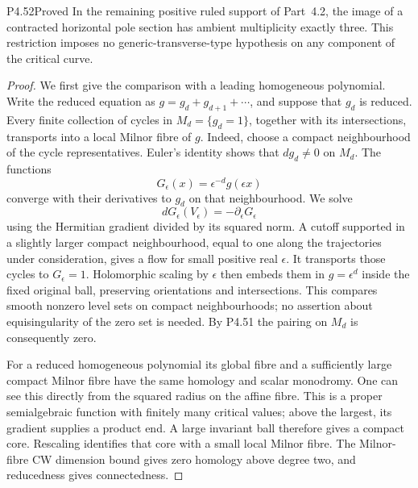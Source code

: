 \begin{statement}{P4.52}{Proved}
In the remaining positive ruled support of Part~4.2,
the image of a contracted horizontal pole section has
ambient multiplicity exactly three. This restriction
imposes no generic-transverse-type hypothesis on
any component of the critical curve.
\end{statement}
\begin{proof}
We first give the comparison with a leading
homogeneous polynomial. Write the reduced equation
as $g=g_d+g_{d+1}+\cdots$, and suppose that $g_d$ is
reduced. Every finite collection of cycles in
$M_d=\{g_d=1\}$, together with its intersections,
transports into a local Milnor fibre of $g$.
Indeed, choose a compact neighbourhood of the cycle
representatives. Euler's identity shows that
$dg_d\ne0$ on $M_d$. The functions
\[
 G_\epsilon(x)=\epsilon^{-d}g(\epsilon x)
\]
converge with their derivatives to $g_d$ on that
neighbourhood. We solve
\[
 dG_\epsilon(V_\epsilon)
                     =-\partial_\epsilon G_\epsilon
\]
using the Hermitian gradient divided by its squared
norm. A cutoff supported in a slightly larger
compact neighbourhood, equal to one along the
trajectories under consideration, gives a flow for
small positive real $\epsilon$. It transports those
cycles to $G_\epsilon=1$. Holomorphic scaling by
$\epsilon$ then embeds them in $g=\epsilon^d$ inside
the fixed original ball, preserving orientations
and intersections. This compares smooth nonzero
level sets on compact neighbourhoods; no assertion
about equisingularity of the zero set is needed.
By P4.51 the pairing on $M_d$ is consequently zero.

For a reduced homogeneous polynomial its global
fibre and a sufficiently large compact Milnor fibre
have the same homology and scalar monodromy. One
can see this directly from the squared radius on
the affine fibre. This is a proper semialgebraic
function with finitely many critical values; above
the largest, its gradient supplies a product end.
A large invariant ball therefore gives a compact
core. Rescaling identifies that core with a small
local Milnor fibre. The Milnor-fibre CW dimension
bound gives zero homology above degree two, and
reducedness gives connectedness.


\end{proof}
